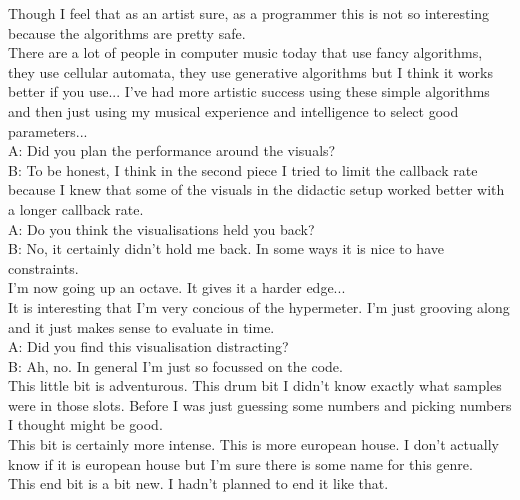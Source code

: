 \documentclass[12pt]{article}
\begin{document}
Though I feel that as an artist sure, as a programmer this is not so interesting because the algorithms are pretty safe.\\

There are a lot of people in computer music today that use fancy algorithms, they use cellular automata, they use generative algorithms but I think it works better if you use... I've had more artistic success using these simple algorithms and then just using my musical experience and intelligence to select good parameters...\\

A: Did you plan the performance around the visuals?\\

B: To be honest, I think in the second piece I tried to limit the callback rate because I knew that some of the visuals in the didactic setup worked better with a longer callback rate.\\

A: Do you think the visualisations held you back?\\

B: No, it certainly didn't hold me back. In some ways it is nice to have constraints.\\

I'm now going up an octave. It gives it a harder edge...\\

It is interesting that I'm very concious of the hypermeter. I'm just grooving along and it just makes sense to evaluate in time.\\

A: Did you find this visualisation distracting?\\

B: Ah, no. In general I'm just so focussed on the code.\\

This little bit is adventurous. This drum bit I didn't know exactly what samples were in those slots. Before I was just guessing some numbers and picking numbers I thought might be good.\\

This bit is certainly more intense. This is more european house. I don't actually know if it is european house but I'm sure there is some name for this genre.\\

This end bit is a bit new. I hadn't planned to end it like that.\\
\end{document}
